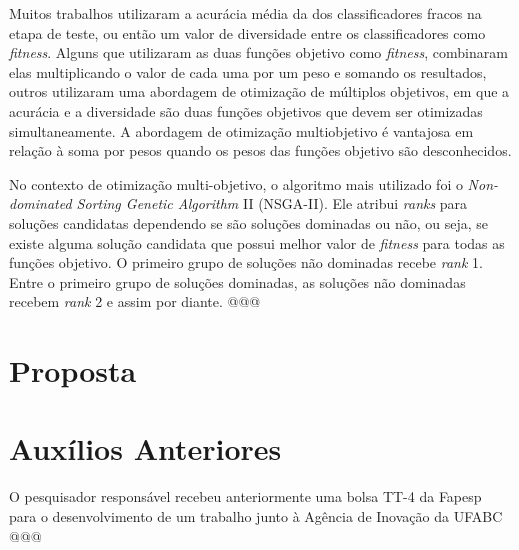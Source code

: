 \documentclass[12pt]{report}
\begin{document}
Muitos trabalhos utilizaram a acurácia média da dos classificadores fracos na etapa de teste, ou então um valor de diversidade entre os classificadores como \textit{fitness}. Alguns que utilizaram as duas funções objetivo como \textit{fitness}, combinaram elas multiplicando o valor de cada uma por um peso e somando os resultados, outros utilizaram uma abordagem de otimização de múltiplos objetivos, em que a acurácia e a diversidade são duas funções objetivos que devem ser otimizadas simultaneamente. A abordagem de otimização multiobjetivo é vantajosa em relação à soma por pesos quando os pesos das funções objetivo são desconhecidos.

No contexto de otimização multi-objetivo, o algoritmo mais utilizado foi o \textit{Non-dominated Sorting Genetic Algorithm} II (NSGA-II). Ele atribui \textit{ranks} para soluções candidatas dependendo se são soluções dominadas ou não, ou seja, se existe alguma solução candidata que possui melhor valor de \textit{fitness} para todas as funções objetivo. O primeiro grupo de soluções não dominadas recebe \textit{rank} 1. Entre o primeiro grupo de soluções dominadas, as soluções não dominadas recebem \textit{rank} 2 e assim por diante. @@@



\chapter{Proposta}




\chapter{Auxílios Anteriores}

O pesquisador responsável recebeu anteriormente uma bolsa TT-4 da Fapesp para o desenvolvimento de um trabalho junto à Agência de Inovação da UFABC @@@ 





\end{document}
